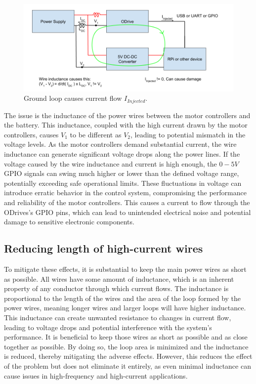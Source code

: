     \begin{figure}[h] %
        \includegraphics[width=\textwidth]{contents/figures/ground_loop_bad.png}
        \caption{Ground loop causes current flow $I_{Injected}$.}
        \label{ground_loop_bad}
    \end{figure}
    
    The issue is the inductance of the power wires between the motor controllers and the battery. This inductance, coupled with the high current drawn by the motor controllers, causes $V_1$ to be different as $V_2$, leading to potential mismatch in the voltage levels. As the motor controllers demand substantial current, the wire inductance can generate significant voltage drops along the power lines. If the voltage caused by the wire inductance and current is high enough, the $0-5V$ GPIO signals can swing much higher or lower than the defined voltage range, potentially exceeding safe operational limits. These fluctuations in voltage can introduce erratic behavior in the control system, compromising the performance and reliability of the motor controllers. This causes a current to flow through the ODrives's GPIO pins, which can lead to unintended electrical noise and potential damage to sensitive electronic components.

    \clearpage %
    
    \subsection{Reducing length of high-current wires}
    
    To mitigate these effects, it is substantial to keep the main power wires as short as possible. All wires have some amount of inductance, which is an inherent property of any conductor through which current flows. The inductance is proportional to the length of the wires and the area of the loop formed by the power wires, meaning longer wires and larger loops will have higher inductance. This inductance can create unwanted resistance to changes in current flow, leading to voltage drops and potential interference with the system's performance. It is beneficial to keep those wires as short as possible and as close together as possible. By doing so, the loop area is minimized and the inductance is reduced, thereby mitigating the adverse effects. However, this reduces the effect of the problem but does not eliminate it entirely, as even minimal inductance can cause issues in high-frequency and high-current applications.
    
